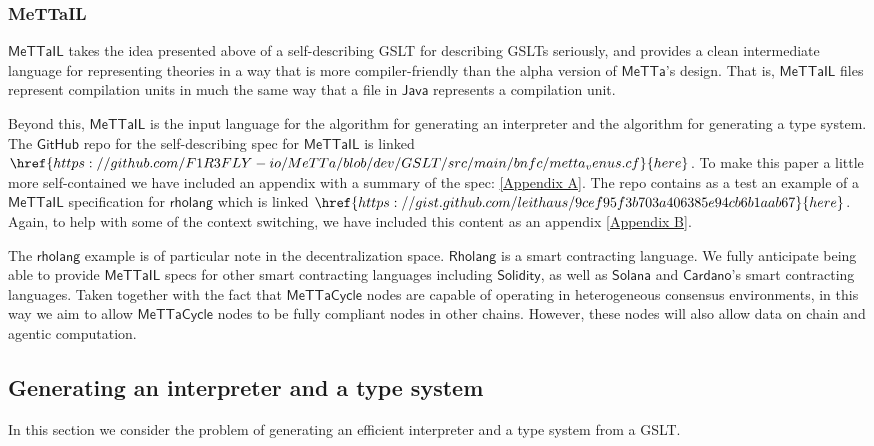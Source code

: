 \documentclass{article}
\newcommand{\MC}{\mathsf{MeTTaCycle}}
\begin{document}
\subsubsection{MeTTaIL}

$\mathsf{MeTTaIL}$ takes the idea presented above of a self-describing
GSLT for describing GSLTs seriously, and provides a clean intermediate
language for representing theories in a way that is more
compiler-friendly than the alpha version of $\mathsf{MeTTa}$'s
design. That is, $\mathsf{MeTTaIL}$ files represent compilation units
in much the same way that a file in $\mathsf{Java}$ represents a
compilation unit.

Beyond this, $\mathsf{MeTTaIL}$ is the input language for the
algorithm for generating an interpreter and the algorithm for
generating a type system. The $\mathsf{GitHub}$ repo for the
self-describing spec for $\mathsf{MeTTaIL}$ is linked
$\href{https://github.com/F1R3FLY-io/MeTTa/blob/dev/GSLT/src/main/bnfc/metta_venus.cf}{here}$. To make this paper a little more self-contained we have included an appendix with a summary of the spec: \ref{Appendix A}. The repo contains as a test an example of a $\mathsf{MeTTaIL}$ specification for $\mathsf{rholang}$
which is linked
$\href{https://gist.github.com/leithaus/9cef95f3b703a406385e94cb6b1aab67}{here}$. Again, to help with some of the context switching, we have included this content as an appendix \ref{Appendix B}.

The $\mathsf{rholang}$ example is of particular note in the
decentralization space. $\mathsf{Rholang}$ is a smart contracting
language. We fully anticipate being able to provide $\mathsf{MeTTaIL}$
specs for other smart contracting languages including
$\mathsf{Solidity}$, as well as $\mathsf{Solana}$ and
$\mathsf{Cardano}$'s smart contracting languages. Taken together with
the fact that $\MC$ nodes are capable of operating in heterogeneous
consensus environments, in this way we aim to allow $\MC$ nodes to be
fully compliant nodes in other chains. However, these nodes will also
allow data on chain and agentic computation.

\subsection{Generating an interpreter and a type system}
\label{Generating an interpreter and a type system}

In this section we consider the problem of generating an efficient interpreter and a type system from a GSLT.
\end{document}
